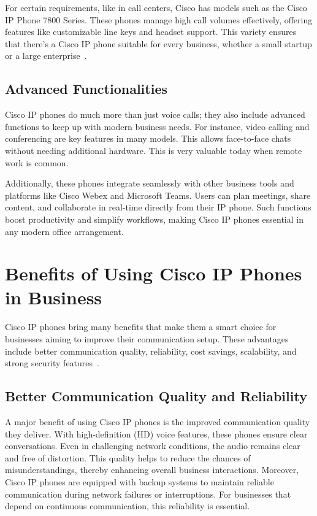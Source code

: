 \documentclass[11pt,a4paper]{article}
\begin{document}
For certain requirements, like in call centers, Cisco has models such as the Cisco IP Phone 7800 Series. These phones manage high call volumes effectively, offering features like customizable line keys and headset support. This variety ensures that there’s a Cisco IP phone suitable for every business, whether a small startup or a large enterprise~\cite{7800-series}.


\subsection*{Advanced Functionalities}

Cisco IP phones do much more than just voice calls; they also include advanced functions to keep up with modern business needs. For instance, video calling and conferencing are key features in many models. This allows face-to-face chats without needing additional hardware. This is very valuable today when remote work is common.

Additionally, these phones integrate seamlessly with other business tools and platforms like Cisco Webex and Microsoft Teams. Users can plan meetings, share content, and collaborate in real-time directly from their IP phone. Such functions boost productivity and simplify workflows, making Cisco IP phones essential in any modern office arrangement.


\section*{Benefits of Using Cisco IP Phones in Business}

Cisco IP phones bring many benefits that make them a smart choice for businesses aiming to improve their communication setup. These advantages include better communication quality, reliability, cost savings, scalability, and strong security features~\cite{Business-Phone-Systems}.

\subsection*{Better Communication Quality and Reliability}

A major benefit of using Cisco IP phones is the improved communication quality they deliver. With high-definition (HD) voice features, these phones ensure clear conversations. Even in challenging network conditions, the audio remains clear and free of distortion. This quality helps to reduce the chances of misunderstandings, thereby enhancing overall business interactions. Moreover, Cisco IP phones are equipped with backup systems to maintain reliable communication during network failures or interruptions. For businesses that depend on continuous communication, this reliability is essential.
\end{document}
